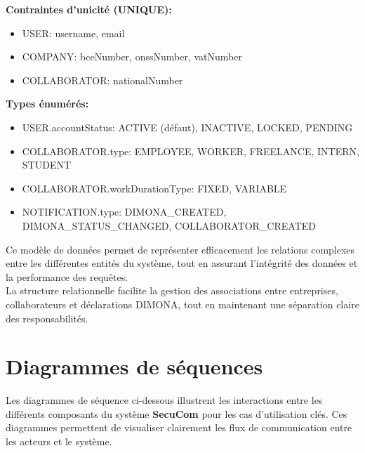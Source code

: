 \newpage

\textbf{Contraintes d'unicité (UNIQUE):}
\begin{itemize}[leftmargin=*,label=\textcolor{darkgray}{$\bullet$},itemsep=0.3em]
  \item USER: username, email
  \item COMPANY: bceNumber, onssNumber, vatNumber
  \item COLLABORATOR: nationalNumber
\end{itemize}

\vspace{0.5cm}

\textbf{Types énumérés:}
\begin{itemize}[leftmargin=*,label=\textcolor{darkgray}{$\bullet$},itemsep=0.3em]
  \item USER.accountStatus: ACTIVE (défaut), INACTIVE, LOCKED, PENDING
  \item COLLABORATOR.type: EMPLOYEE, WORKER, FREELANCE, INTERN, STUDENT
  \item COLLABORATOR.workDurationType: FIXED, VARIABLE
  \item NOTIFICATION.type: DIMONA\_CREATED, DIMONA\_STATUS\_CHANGED, COLLABORATOR\_CREATED
\end{itemize}

\vspace{0.5cm}

\begin{tcolorbox}[
  title={\textbf{Modèle de données robuste}},
  colback=blue!5!white,
  colframe=primarycolor,
  fonttitle=\bfseries,
  boxrule=0.5mm,
  arc=2mm,
  left=6mm,
  right=6mm,
  top=6mm,
  bottom=6mm
]
Ce modèle de données permet de représenter efficacement les relations complexes entre les différentes entités du système, tout en assurant l'intégrité des données et la performance des requêtes.\\ La structure relationnelle facilite la gestion des associations entre entreprises, collaborateurs et déclarations DIMONA, tout en maintenant une séparation claire des responsabilités.
\end{tcolorbox}

\newpage

\section{Diagrammes de séquences}

\noindent Les diagrammes de séquence ci-dessous illustrent les interactions entre les différents composants du système \textbf{SecuCom} pour les cas d'utilisation clés. Ces diagrammes permettent de visualiser clairement les flux de communication entre les acteurs et le système.

